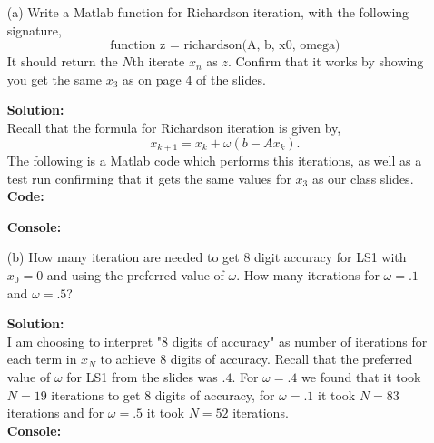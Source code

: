 \documentclass[12pt]{article}
\makeatletter
\theoremstyle{homework}
\newenvironment{exercise}[1]
{\def\@currentlabel{#1}\exercisecore}
{\endexercisecore}
\newcommand{\localhead}[1]{\par\smallskip\noindent\textbf{#1}\nobreak\\}%
\newcommand\solution{\localhead{Solution:}}
\makeatother
\begin{document}
\begin{exercise}{Problem P12} 
  \begin{enumerate}
    \item[(a)] Write a Matlab function for Richardson iteration, with the following signature, 
    \begin{equation*}
      \text{function z = richardson(A, b, x0, omega)}
    \end{equation*}
    It should return the $N$th iterate $x_n$ as $z$. Confirm that it works by showing you get the same
    $x_3$ as on page 4 of the slides. 
    \solution Recall that the formula for Richardson iteration is given by, 
    \begin{equation*}
      x_{k + 1} = x_k + \omega(b - Ax_k).
    \end{equation*}
    The following is a Matlab code which performs this iterations, as well as a test run confirming 
    that it gets the same values for $x_3$ as our class slides.\\

    \textbf{Code:}
    \begin{center}
      
    \end{center}

    \textbf{Console:}
    \begin{center}
      
    \end{center}

    \vspace*{.15in}


    \item[(b)] How many iteration are needed to get 8 digit accuracy for LS1 with $x_0 = 0$
    and using the preferred value of $\omega$. How many iterations for $\omega = .1$ and $\omega = .5$?
    \solution I am choosing to interpret "8 digits of accuracy" as number of iterations for each term in $x_N$
    to achieve 8 digits of accuracy. Recall that the preferred value of $\omega$ for LS1 from the slides was 
    $.4$. For $\omega = .4$ we found that it took $N = 19$ iterations to get 8 digits of accuracy, for $\omega = .1$ it took $N = 83$ 
    iterations and for $\omega = .5$ it took $N = 52$ iterations.\\ 
    
    \textbf{Console:}
    \begin{center}
      
    \end{center}








  \end{enumerate}
\end{exercise}
\vspace{1in}
\end{document}
